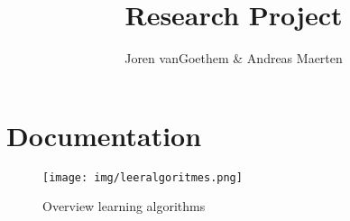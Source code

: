 \documentclass[a4paper]{report}
\begin{document}
\begin{titlepage}
    \author{Joren vanGoethem & Andreas Maerten}
    \title{Research Project}
\end{titlepage}

\maketitle
\newpage
\tableofcontents
\newpage


\section{Documentation}

\begin{figure}[H]
    \centering
    \texttt{[image: img/leeralgoritmes.png]}
    \caption{Overview learning algorithms}
\end{figure}
\end{document}
